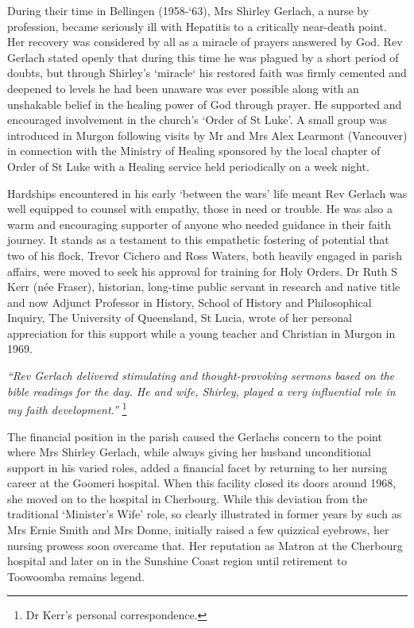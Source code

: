 During their time in Bellingen (1958-`63), Mrs Shirley Gerlach, a nurse by profession, became seriously ill with Hepatitis to a critically near-death point. Her recovery was considered by all as a miracle of prayers answered by God. Rev Gerlach stated openly that during this time he was plagued by a short period of doubts, but through Shirley's `miracle` his restored faith was firmly cemented and deepened to levels he had been unaware was ever possible along with an unshakable belief in the healing power of God through prayer. He supported and encouraged involvement in the church's `Order of St Luke'. A small group was introduced in Murgon following visits by Mr and Mrs Alex Learmont (Vancouver) in connection with the Ministry of Healing sponsored by the local chapter of Order of St Luke with a Healing service held periodically on a week night.



Hardships encountered in his early `between the wars' life meant Rev Gerlach was well equipped to counsel with empathy, those in need or trouble. He was also a warm and encouraging supporter of anyone who needed guidance in their faith journey. It stands as a testament to this empathetic fostering of potential that two of his flock, Trevor Cichero and Ross Waters, both heavily engaged in parish affairs, were moved to seek his approval for training for Holy Orders. Dr Ruth S Kerr (née Fraser), historian, long-time public servant in research and native title and now Adjunct Professor in History, School of History and Philosophical Inquiry, The University of Queensland, St Lucia, wrote of her personal appreciation for this support while a young teacher and Christian in Murgon in 1969.



\emph{``Rev Gerlach delivered stimulating and thought-provoking sermons based on the bible readings for the day. He and wife, Shirley, played a very influential role in my faith development.''} \footnote{Dr Kerr's personal correspondence.}


The financial position in the parish caused the Gerlachs concern to the point where Mrs Shirley Gerlach, while always giving her husband unconditional support in his varied roles, added a financial facet by returning to her nursing career at the Goomeri hospital. When this facility closed its doors around 1968, she moved on to the hospital in Cherbourg. While this deviation from the traditional `Minister's Wife' role, so clearly illustrated in former years by such as Mrs Ernie Smith and Mrs Donne, initially raised a few quizzical eyebrows, her nursing prowess soon overcame that. Her reputation as Matron at the Cherbourg hospital and later on in the Sunshine Coast region until retirement to Toowoomba remains legend.



